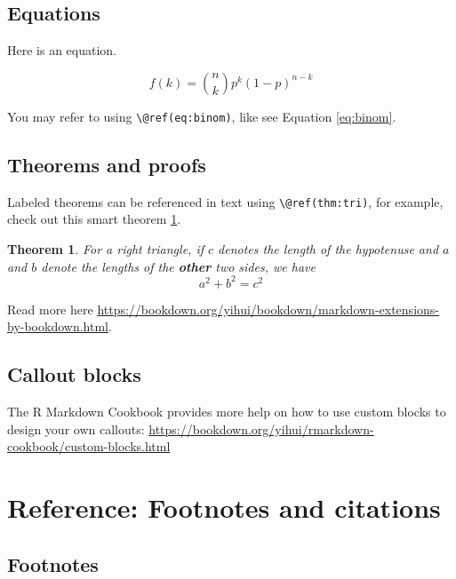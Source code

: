 \documentclass[
]{book}
\newtheorem{theorem}{Theorem}[chapter]
\theoremstyle{definition}
\theoremstyle{definition}
\theoremstyle{definition}
\theoremstyle{definition}
\theoremstyle{remark}
\begin{document}
\hypertarget{equations}{%
\section{Equations}\label{equations}}

Here is an equation.

\begin{equation} 
  f\left(k\right) = \binom{n}{k} p^k\left(1-p\right)^{n-k}
  \label{eq:binom}
\end{equation}

You may refer to using \texttt{\textbackslash{}@ref(eq:binom)}, like see Equation \eqref{eq:binom}.

\hypertarget{theorems-and-proofs}{%
\section{Theorems and proofs}\label{theorems-and-proofs}}

Labeled theorems can be referenced in text using \texttt{\textbackslash{}@ref(thm:tri)}, for example, check out this smart theorem \ref{thm:tri}.

\begin{theorem}
\protect\hypertarget{thm:tri}{}\label{thm:tri}For a right triangle, if \(c\) denotes the \emph{length} of the hypotenuse
and \(a\) and \(b\) denote the lengths of the \textbf{other} two sides, we have
\[a^2 + b^2 = c^2\]
\end{theorem}

Read more here \url{https://bookdown.org/yihui/bookdown/markdown-extensions-by-bookdown.html}.

\hypertarget{callout-blocks}{%
\section{Callout blocks}\label{callout-blocks}}

The R Markdown Cookbook provides more help on how to use custom blocks to design your own callouts: \url{https://bookdown.org/yihui/rmarkdown-cookbook/custom-blocks.html}

\hypertarget{reference-footnotes-and-citations}{%
\chapter*{Reference: Footnotes and citations}\label{reference-footnotes-and-citations}}

\hypertarget{footnotes}{%
\section{Footnotes}\label{footnotes}}
\end{document}
